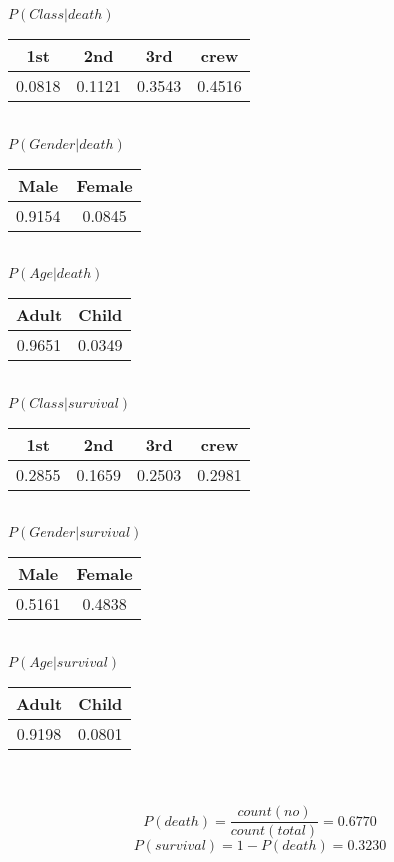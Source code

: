 \documentclass[letterpaper, 10pt]{article}
\begin{document}
$P(Class|death)$\\
\begin{tabular}{| c | c | c | c |}
    \hline
    1st     & 2nd     & 3rd       & crew   \\ \hline
    0.0818  & 0.1121  & 0.3543    & 0.4516 \\ 
    \hline
\end{tabular}
\\
$P(Gender|death)$\\
\begin{tabular}{| c | c |}
    \hline
    Male     & Female \\ \hline
    0.9154  & 0.0845  \\ 
    \hline
\end{tabular}
\\
$P(Age|death)$\\
\begin{tabular}{| c | c |}
    \hline
    Adult     & Child \\ \hline
    0.9651  & 0.0349  \\ 
    \hline
\end{tabular}
\\
$P(Class|survival)$\\
\begin{tabular}{| c | c | c | c |}
    \hline
    1st     & 2nd     & 3rd       & crew   \\ \hline
    0.2855  & 0.1659  & 0.2503    & 0.2981 \\ 
    \hline
\end{tabular}
\\
$P(Gender|survival)$\\
\begin{tabular}{| c | c |}
    \hline
    Male     & Female \\ \hline
    0.5161  & 0.4838  \\ 
    \hline
\end{tabular}
\\
$P(Age|survival)$\\
\begin{tabular}{| c | c |}
    \hline
    Adult     & Child \\ \hline
    0.9198  & 0.0801  \\ 
    \hline
\end{tabular}
\\\\
$$P(death) = \frac{count(no)}{count(total)} = 0.6770 $$
$$P(survival) = 1 - P(death) = 0.3230 $$
\\\\
\end{document}
